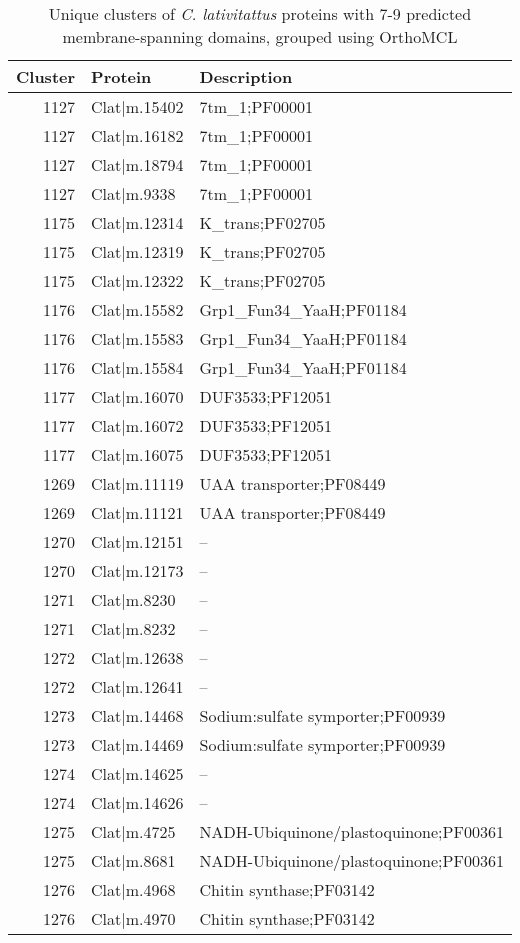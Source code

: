 \begin{table}[htbp]
\caption[orthoMCL clusters for transmembrane proteins]{Unique clusters of \textit{C. lativitattus} proteins with 7-9 predicted membrane-spanning domains, grouped using OrthoMCL} 
\label{tab:ChClat_orthomcl}
\begin{tabular}{rll}
 Cluster & Protein & Description \\ 
  \hline
1127 & Clat$|$m.15402 & 7tm\_1;PF00001 \\ 
   \hline
1127 & Clat$|$m.16182 & 7tm\_1;PF00001 \\ 
  1127 & Clat$|$m.18794 & 7tm\_1;PF00001 \\ 
  1127 & Clat$|$m.9338 & 7tm\_1;PF00001 \\ 
  1175 & Clat$|$m.12314 & K\_trans;PF02705 \\ 
  1175 & Clat$|$m.12319 & K\_trans;PF02705 \\ 
  1175 & Clat$|$m.12322 & K\_trans;PF02705 \\ 
  1176 & Clat$|$m.15582 & Grp1\_Fun34\_YaaH;PF01184 \\ 
  1176 & Clat$|$m.15583 & Grp1\_Fun34\_YaaH;PF01184 \\ 
  1176 & Clat$|$m.15584 & Grp1\_Fun34\_YaaH;PF01184 \\ 
  1177 & Clat$|$m.16070 & DUF3533;PF12051 \\ 
  1177 & Clat$|$m.16072 & DUF3533;PF12051 \\ 
  1177 & Clat$|$m.16075 & DUF3533;PF12051 \\ 
  1269 & Clat$|$m.11119 & UAA transporter;PF08449 \\ 
  1269 & Clat$|$m.11121 & UAA transporter;PF08449 \\ 
  1270 & Clat$|$m.12151 & -- \\ 
  1270 & Clat$|$m.12173 & -- \\ 
  1271 & Clat$|$m.8230 & -- \\ 
  1271 & Clat$|$m.8232 & -- \\ 
  1272 & Clat$|$m.12638 & -- \\ 
  1272 & Clat$|$m.12641 & -- \\ 
  1273 & Clat$|$m.14468 & Sodium:sulfate symporter;PF00939 \\ 
  1273 & Clat$|$m.14469 & Sodium:sulfate symporter;PF00939 \\ 
  1274 & Clat$|$m.14625 & -- \\ 
  1274 & Clat$|$m.14626 & -- \\ 
  1275 & Clat$|$m.4725 & NADH-Ubiquinone/plastoquinone;PF00361 \\ 
  1275 & Clat$|$m.8681 & NADH-Ubiquinone/plastoquinone;PF00361 \\ 
  1276 & Clat$|$m.4968 & Chitin synthase;PF03142 \\ 
  1276 & Clat$|$m.4970 & Chitin synthase;PF03142 \\ 
   \hline
\end{tabular}
\end{table}


